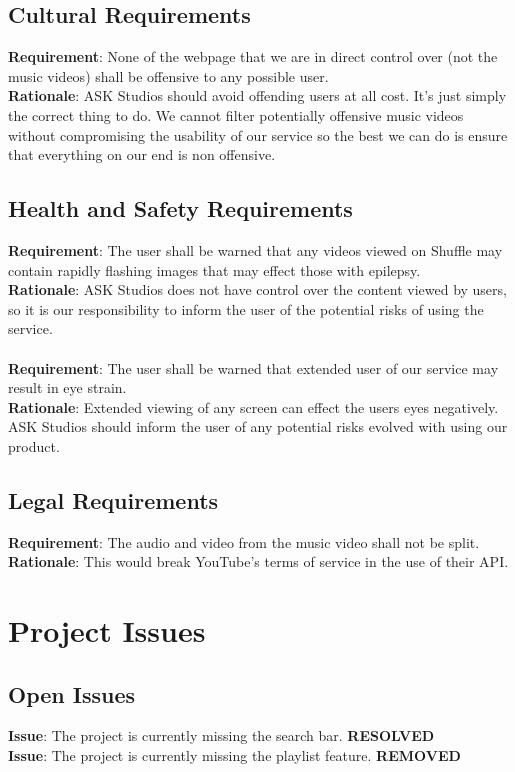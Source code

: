 \documentclass[12pt, titlepage]{article}
\begin{document}
\subsection{Cultural Requirements}
\textbf{Requirement}: None of the webpage that we are in direct control over (not the music videos) shall be offensive to any possible user.\\
\textbf{Rationale}: ASK Studios should avoid offending users at all cost. It's just simply the correct thing to do. We cannot filter potentially offensive music videos without compromising the usability of our service so the best we can do is ensure that everything on our end is non offensive.

\subsection{Health and Safety Requirements}
\textbf{Requirement}: The user shall be warned that any videos viewed on Shuffle may contain rapidly flashing images that may effect those with epilepsy.\\
\textbf{Rationale}: ASK Studios does not have control over the content viewed by users, so it is our responsibility to inform the user of the potential risks of using the service.\\\\
\textbf{Requirement}: The user shall be warned that extended user of our service may result in eye strain.\\
\textbf{Rationale}: Extended viewing of any screen can effect the users eyes negatively. ASK Studios should inform the user of any potential risks evolved with using our product.
\color{black}

\subsection{Legal Requirements}
\textbf{Requirement}: The audio and video from the music video shall not be split.\\
\textbf{Rationale}: This would break YouTube's terms of service in the use of their API.

\section{Project Issues}

\subsection{Open Issues}
\color{red}
\textbf{Issue}: The project is currently missing the search bar. \textbf{RESOLVED}\\
\textbf{Issue}: The project is currently missing the playlist feature. \textbf{REMOVED}\\
\color{black}
\end{document}

